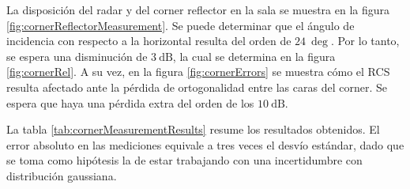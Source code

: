 La disposición del radar y del corner reflector en la sala se muestra en la figura \ref{fig:cornerReflectorMeasurement}. Se puede determinar que el ángulo de incidencia con respecto a la horizontal resulta del orden de $\SI{24}{\deg}$. Por lo tanto, se espera una disminución de $\SI{3}{\dB}$, la cual se determina en la figura \ref{fig:cornerRel}. A su vez, en la figura \ref{fig:cornerErrors} se muestra cómo el RCS resulta afectado ante la pérdida de ortogonalidad entre las caras del corner. Se espera que haya una pérdida extra del orden de los $\SI{10}{\dB}$.

La tabla \ref{tab:cornerMeasurementResults} resume los resultados obtenidos. El error absoluto en las mediciones equivale a tres veces el desvío estándar, dado que se toma como hipótesis la de estar trabajando con una incertidumbre con distribución gaussiana.

